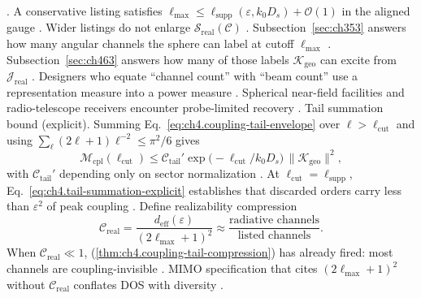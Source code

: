 \cite{stratton1941}.
\label{cor:ch4.safe-listing-width}
A conservative listing satisfies \(\ell_{\max}\le\ell_{\mathrm{supp}}(\varepsilon,k_{0}D_{s})+\mathcal{O}(1)\) in the aligned gauge
\cite{hansen1988}. Wider listings do not enlarge \(\mathcal{S}_{\mathrm{real}}(\mathcal{C})\) \cite{devaney2004}.
Subsection~\ref{sec:ch353} answers how many angular channels the sphere can label at cutoff \(\ell_{\max}\) \cite{jackson1999}.
Subsection~\ref{sec:ch463} answers how many of those labels \(\boldsymbol{\mathcal{K}}_{\mathrm{geo}}\) can excite from \(\mathcal{J}_{\mathrm{real}}\)
\cite{stratton1941}. Designers who equate ``channel count'' with ``beam count'' use a representation measure into a power measure
\cite{hansen1988}. 
Spherical near-field facilities and radio-telescope receivers encounter probe-limited recovery \cite{hansen1988}.
Tail summation bound (explicit). Summing Eq.~\eqref{eq:ch4.coupling-tail-envelope} over \(\ell>\ell_{\mathrm{cut}}\) and using \(\sum_{\ell}(2\ell+1)\ell^{-2}\le\pi^{2}/6\)
gives
\begin{equation}
\label{eq:ch4.tail-summation-explicit}
\mathcal{M}_{\mathrm{cpl}}(\ell_{\mathrm{cut}})
\le
\mathcal{C}_{\mathrm{tail}}'\exp\!\bigl(-\ell_{\mathrm{cut}}/k_{0}D_{s}\bigr)\,\|\boldsymbol{\mathcal{K}}_{\mathrm{geo}}\|^{2},
\end{equation}
with \(\mathcal{C}_{\mathrm{tail}}'\) depending only on sector normalization \cite{hansen1988}. At \(\ell_{\mathrm{cut}}=\ell_{\mathrm{supp}}\),
Eq.~\eqref{eq:ch4.tail-summation-explicit} establishes that discarded orders carry less than \(\varepsilon^{2}\) of peak coupling
\cite{harrington2001}.
Define realizability compression
\begin{equation}
\label{eq:ch4.realizability-compression}
\mathcal{C}_{\mathrm{real}}
=
\frac{d_{\mathrm{eff}}(\varepsilon)}{(2\ell_{\max}+1)^{2}}
\approx
\frac{\text{radiative channels}}{\text{listed channels}}.
\end{equation}
When \(\mathcal{C}_{\mathrm{real}}\ll1\), (\ref{thm:ch4.coupling-tail-compression}) has already fired: most channels are coupling-invisible
\cite{hansen1988}. MIMO specification that cites \((2\ell_{\max}+1)^{2}\) without \(\mathcal{C}_{\mathrm{real}}\)
conflates DOS with diversity \cite{jackson1999}.
